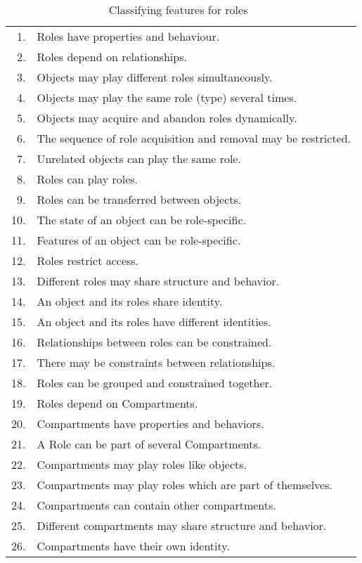 \begin{table}[t]
  \caption{Classifying features for roles~\cite{Stei-DKE00,KuLG-SLE14}}
  \small
  \centering
  \begin{tabularx}{0.8\linewidth}{rX} 
    \toprule
    1.  & Roles have properties and behaviour.\\
    2.  & Roles depend on relationships.\\
    3.  & Objects may play different roles simultaneously.\\
    4.  & Objects may play the same role (type) several times.\\
    5.  & Objects may acquire and abandon roles dynamically.\\
    6.  & The sequence of role acquisition and removal may be restricted.\\
    7.  & Unrelated objects can play the same role.\\
    8.  & Roles can play roles.\\
    9.  & Roles can be transferred between objects.\\
    10. & The state of an object can be role-specific.\\
    11. & Features of an object can be role-specific.\\
    12. & Roles restrict access.\\
    13. & Different roles may share structure and behavior.\\
    14. & An object and its roles share identity.\\
    15. & An object and its roles have different identities.\\
    \midrule
    16. & Relationships between roles can be constrained.\\
    17. & There may be constraints between relationships.\\
    18. & Roles can be grouped and constrained together.\\
    19. & Roles depend on Compartments.\\
    20. & Compartments have properties and behaviors.\\
    21. & A Role can be part of several Compartments.\\
    22. & Compartments may play roles like objects.\\
    23. & Compartments may play roles which are part of themselves.\\
    24. & Compartments can contain other compartments.\\
    25. & Different compartments may share structure and behavior.\\
    26. & Compartments have their own identity.\\
    \bottomrule
  \end{tabularx}
  \label{tab:role-features}
\end{table}


